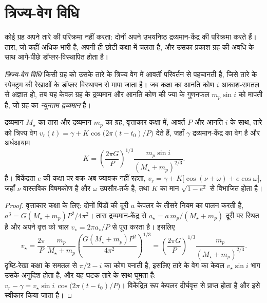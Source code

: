 \section{त्रिज्य-वेग विधि}\label{sec:b3:exoplanets:rv}

कोई ग्रह अपने तारे की परिक्रमा नहीं करता: दोनों अपने उभयनिष्ठ द्रव्यमान-केंद्र की परिक्रमा करते हैं।
तारा, जो कहीं अधिक भारी है, अपनी ही छोटी कक्षा में चलता है, और उसका प्रकाश
ग्रह की अवधि के साथ आगे-पीछे डॉप्लर-विस्थापित होता है।

\begin{definition}[त्रिज्य-वेग विधि; न्यूनतम द्रव्यमान]\label{def:b3:exoplanets:rv}
\emph{त्रिज्य-वेग विधि} किसी ग्रह को उसके तारे के
त्रिज्य वेग में आवर्ती परिवर्तन से पहचानती है,
जिसे तारे के स्पेक्ट्रम की रेखाओं के डॉप्लर विस्थापन से मापा जाता है। जब
कक्षा का आनति कोण $i$ आकाश-समतल से अज्ञात हो, तब यह
केवल ग्रह के द्रव्यमान और आनति कोण की ज्या के गुणनफल $m_p\sin i$ को मापती है,
जो ग्रह का \emph{न्यूनतम द्रव्यमान}
है।
\end{definition}

\begin{theorem}[त्रिज्य-वेग अर्धआयाम]\label{thm:b3:exoplanets:semi-amplitude}
द्रव्यमान $M_\star$ का तारा और द्रव्यमान $m_p$ का ग्रह, वृत्ताकार कक्षा में,
आवर्त $P$ और आनति $i$ के साथ, तारे को त्रिज्य वेग
$v_r(t) = \gamma + K\cos\bigl(2\pi(t - t_0)/P\bigr)$ देते हैं, जहाँ $\gamma$ द्रव्यमान-केंद्र का
वेग है और अर्धआयाम
\[
K = \left(\frac{2\pi G}{P}\right)^{1/3}
    \frac{m_p\sin i}{(M_\star + m_p)^{2/3}} .
\]
है। विकेंद्रता $e$ की कक्षा पर वक्र अब ज्यावक्र नहीं रहता,
$v_r = \gamma + K\bigl[\cos(\nu + \omega) + e\cos\omega\bigr]$, जहाँ $\nu$
वास्तविक विषमकोण है और $\omega$ उपसौर-तर्क है, तथा $K$ का मान
$\sqrt{1 - e^2}$ से विभाजित होता है।
\end{theorem}

\begin{proof}
वृत्ताकार कक्षा के लिए: दोनों पिंडों की दूरी $a$ केपलर के तीसरे नियम का पालन करती है,
$a^3 = G(M_\star + m_p)P^2/4\pi^2$। तारा द्रव्यमान-केंद्र से
$a_\star = a\,m_p/(M_\star + m_p)$ दूरी पर स्थित है
और अपने वृत्त को चाल $v_\star = 2\pi a_\star/P$ से पूरा करता है। इसलिए
\[
v_\star = \frac{2\pi}{P}\,\frac{m_p}{M_\star + m_p}
          \left(\frac{G(M_\star + m_p)P^2}{4\pi^2}\right)^{1/3}
        = \left(\frac{2\pi G}{P}\right)^{1/3}\frac{m_p}{(M_\star + m_p)^{2/3}} .
\]
दृष्टि-रेखा कक्षा के समतल से $\pi/2 - i$ का कोण बनाती है,
इसलिए तारे के वेग का केवल $v_\star\sin i$ भाग उसके अनुदिश होता है, और
यह घटक तारे के साथ घूमता है: $v_r - \gamma = v_\star\sin i\,
\cos\bigl(2\pi(t - t_0)/P\bigr)$। विकेंद्रित रूप केपलर दीर्घवृत्त से
प्राप्त होता है और इसे स्वीकार किया जाता है।
\end{proof}

